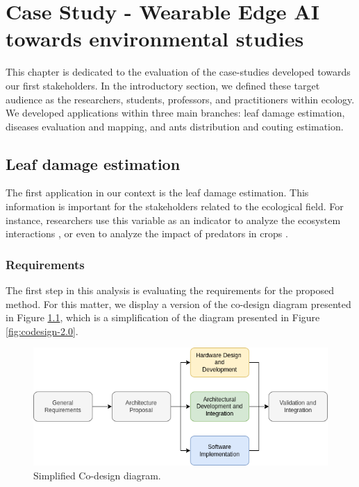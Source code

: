 \chapter{Case Study - Wearable Edge AI towards environmental studies}
\label{chap:ecology}


This chapter is dedicated to the evaluation of the case-studies developed towards our first stakeholders. In the introductory section, we defined these target audience as the researchers, students, professors, and practitioners within ecology. We developed applications within three main branches: leaf damage estimation, diseases evaluation and mapping, and ants distribution and couting estimation.

\section{Leaf damage estimation}

The first application in our context is the leaf damage estimation. This information is important for the stakeholders related to the ecological field. For instance, researchers use this variable as an indicator to analyze the ecosystem interactions \cite{muiruri2019forest,benitez2018effect}, or even to analyze the impact of predators in crops \cite{saidov2018first,baudron2019understanding}.

\subsection{Requirements}

The first step in this analysis is evaluating the requirements for the proposed method. For this matter, we display a version of the co-design diagram presented in Figure \ref{fig:simplified-codesign-1}, which is a simplification of the diagram presented in Figure \ref{fig:codesign-2.0}. 

\begin{figure}[ht!]
    \centering
    \includegraphics[width = .8\linewidth]{Figures/simplified-codesign.png}
    \caption{Simplified Co-design diagram.}
    \label{fig:simplified-codesign-1}
\end{figure}

